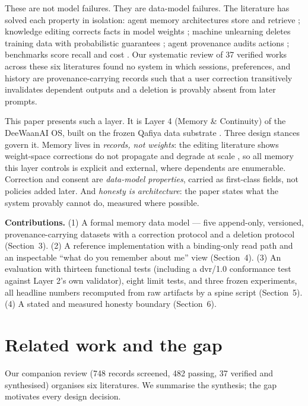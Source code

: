 \documentclass[11pt]{article}
\begin{document}
These are not model failures. They are data-model failures. The literature has solved each property in isolation: agent memory architectures store and retrieve \cite{memgpt,genagents,zep,memorysurvey}; knowledge editing corrects facts in model weights \cite{decao,rome,memit,kesurvey}; machine unlearning deletes training data with probabilistic guarantees \cite{ginart,sisa,athena}; agent provenance audits actions \cite{agenttrace,mapgraph}; benchmarks score recall and cost \cite{longmemeval,locomo,ragvslc}. Our systematic review of 37 verified works across these six literatures found no system in which sessions, preferences, and history are provenance-carrying records such that a user correction transitively invalidates dependent outputs and a deletion is provably absent from later prompts.

This paper presents such a layer. It is Layer 4 (Memory \& Continuity) of the DeeWaanAI OS, built on the frozen Qafiya data substrate \cite{qafiya}. Three design stances govern it. Memory lives in \emph{records, not weights}: the editing literature shows weight-space corrections do not propagate \cite{ripple,mquake} and degrade at scale \cite{editatscale}, so all memory this layer controls is explicit and external, where dependents are enumerable. Correction and consent are \emph{data-model properties}, carried as first-class fields, not policies added later. And \emph{honesty is architecture}: the paper states what the system provably cannot do, measured where possible.

\textbf{Contributions.} (1) A formal memory data model --- five append-only, versioned, provenance-carrying datasets with a correction protocol and a deletion protocol (Section~3). (2) A reference implementation with a binding-only read path and an inspectable ``what do you remember about me'' view (Section~4). (3) An evaluation with thirteen functional tests (including a dvr/1.0 conformance test against Layer 2's own validator), eight limit tests, and three frozen experiments, all headline numbers recomputed from raw artifacts by a spine script (Section~5). (4) A stated and measured honesty boundary (Section~6).

\section{Related work and the gap}
\label{sec:related}
Our companion review (748 records screened, 482 passing, 37 verified and synthesised) organises six literatures. We summarise the synthesis; the gap motivates every design decision.
\end{document}
